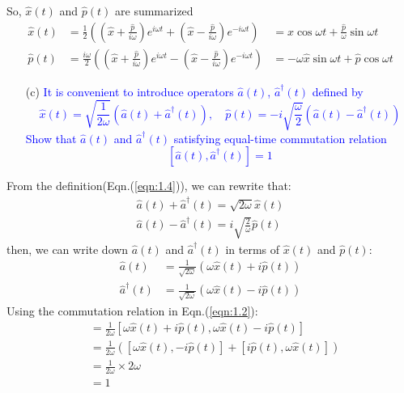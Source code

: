\documentclass[11pt, a4paper]{article}
\begin{document}
So, $\hat{x}(t)$ and $\hat{p}(t)$ are summarized
\begin{align}
    \hat{x}(t) & = \frac{1}{2}\left( \left( \hat{x} + \frac{\hat{p}}{i\omega} \right) e^{i \omega t} + \left( \hat{x} - \frac{\hat{p}}{i\omega} \right) e^{-i \omega t} \right) & = \hat{x}\cos \omega t + \frac{\hat{p}}{\omega}\sin{\omega t} \\
    \hat{p}(t) & = \frac{i \omega}{2}\left( \left(\hat{x} + \frac{\hat{p}}{i\omega} \right) e^{i \omega t} - \left(\hat{x} - \frac{\hat{p}}{i\omega} \right) e^{-i \omega t} \right) & = -\omega \hat{x}\sin \omega t + \hat{p}\cos{\omega t}
\end{align}

\newpage
\begin{enumerate}
    \item [(c)] \textcolor{blue}{
    It is convenient to introduce operators $\hat{a}(t)$, $\hat{a}^\dagger(t)$ defined by
    \begin{equation}\label{eqn:1.4}
        \hat{x}(t) = \sqrt{\frac{1}{2\omega}}\left( \hat{a}(t) + \hat{a}^\dagger(t) \right), \quad \hat{p}(t) = -i\sqrt{\frac{\omega}{2}}\left( \hat{a}(t) - \hat{a}^\dagger(t) \right)
    \end{equation}
    Show that $\hat{a}(t)$ and $\hat{a}^\dagger(t)$ satisfying equal-time commutation relation
    \begin{equation}\label{eqn:1.5}
        [\hat{a}(t), \hat{a}^\dagger(t)] = 1
    \end{equation}
    }
\end{enumerate}
From the definition(Eqn.(\ref{eqn:1.4})), we can rewrite that:
\begin{align}
    \hat{a}(t) + \hat{a}^\dagger(t) = \sqrt{2\omega} \hat{x}(t) \\
    \hat{a}(t) - \hat{a}^\dagger(t) = i\sqrt{\frac{2}{\omega}}\hat{p}(t)
\end{align}
then, we can write down $\hat{a}(t)$ and $\hat{a}^\dagger(t)$ in terms of $\hat{x}(t)$ and $\hat{p}(t)$:
\begin{align}
    \hat{a}(t) & = \frac{1}{\sqrt{2\omega}} \left( \omega \hat{x}(t) + i\hat{p}(t) \right) \\
    \hat{a}^\dagger(t) & = \frac{1}{\sqrt{2\omega}} \left( \omega \hat{x}(t) - i\hat{p}(t) \right)
\end{align}
Using the commutation relation in Eqn.(\ref{eqn:1.2}):
\begin{align}
    [\hat{a}(t), \hat{a}^\dagger(t)] & = \frac{1}{2\omega} [\omega \hat{x}(t) + i\hat{p}(t), \omega \hat{x}(t) - i\hat{p}(t)] \\
    & = \frac{1}{2\omega}\left( [\omega \hat{x}(t),  - i\hat{p}(t)] + [i\hat{p}(t), \omega \hat{x}(t)]\right) \\
    & = \frac{1}{2\omega} \times 2 \omega \\
    & = 1
\end{align}
\end{document}
